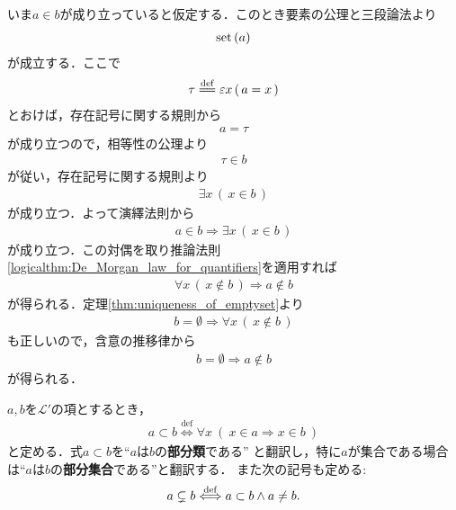 	\begin{prf}
		いま$a \in b$が成り立っていると仮定する．このとき要素の公理と三段論法より
		\begin{align}
			\operatorname*{set} \left(a\right)
		\end{align}
		が成立する．ここで
		\begin{align}
			\tau \defeq \varepsilon x\, (\, a = x\, )
		\end{align}
		とおけば，存在記号に関する規則から
		\begin{align}
			a = \tau
		\end{align}
		が成り立つので，相等性の公理より
		\begin{align}
			\tau \in b
		\end{align}
		が従い，存在記号に関する規則より
		\begin{align}
			\exists x\, (\, x \in b\, )
		\end{align}
		が成り立つ．よって演繹法則から
		\begin{align}
			a \in b \Longrightarrow \exists x\, (\, x \in b\, )
		\end{align}
		が成り立つ．この対偶を取り推論法則\ref{logicalthm:De_Morgan_law_for_quantifiers}を適用すれば
		\begin{align}
			\forall x\, (\, x \notin b\, ) \Longrightarrow a \notin b
		\end{align}
		が得られる．定理\ref{thm:uniqueness_of_emptyset}より
		\begin{align}
			b = \emptyset \Longrightarrow \forall x\, (\, x \notin b\, )
		\end{align}
		も正しいので，含意の推移律から
		\begin{align}
			b = \emptyset \Longrightarrow a \notin b
		\end{align}
		が得られる．
		\QED
	\end{prf}
	
	\begin{screen}
		\begin{dfn}[部分類]
			$a,b$を$\mathcal{L}'$の項とするとき，
			\begin{align}
				a \subset b \overset{\mathrm{def}}{\Longleftrightarrow}
				\forall x\ (\ x \in a \Longrightarrow x \in b\ )
			\end{align}
			と定める．式$a \subset b$を``$a$は$b$の{\bf 部分類}である''
			と翻訳し，特に$a$が集合である場合は``$a$は$b$の{\bf 部分集合}である''と翻訳する．
			また次の記号も定める:
			\begin{align}
				a \subsetneq b \overset{\mathrm{def}}{\Longleftrightarrow} a \subset b \wedge a \neq b.
			\end{align}
		\end{dfn}
	\end{screen}
	
